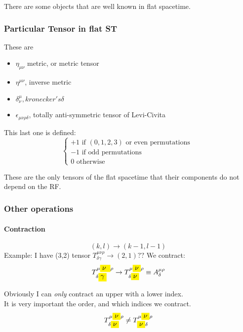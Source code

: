 There are some objects that are well known in flat spacetime.
\subsubsection{Particular Tensor in flat ST}
These are
\begin{itemize}
	\item $\eta_{\mu  \nu }$ metric, or metric tensor
	\item $\eta^{\mu \nu }$, inverse metric
	\item $\delta^{\mu }_{\nu }, kronecker's \delta $
	\item $\epsilon_{\mu \nu \rho \delta }$, totally anti-symmetric tensor of Levi-Civita
\end{itemize}

This last one is defined:
\begin{equation}
\begin{cases}
+1 \text{ if } \left( 0,1,2,3 \right) \text{ or even permutations } \\
-1 \text{ if  odd permutations} \\
0 \text{ otherwise }
\end{cases}
\end{equation}

These are the only tensors of the flat spacetime that their components do not depend on the RF. \\

\subsubsection{Other operations}
\paragraph{Contraction} \[
	\left( k,l \right) \to \left( k-1, l-1 \right)
\]
Example: I have (3,2) tensor $T^{\mu \nu \rho }_{\delta \gamma } \to \left( 2,1 \right) ??$
We contract:
\[
	T^{\mu \colorbox{yellow}{$\nu$ } \rho  }_{\delta \colorbox{yellow}{$\gamma$} } \to T^{\mu  \colorbox{yellow}{$ \nu   $} \rho }_{\delta \colorbox{yellow}{$ \nu   $} } \equiv A^{\mu  \rho }_{\delta } 
\]

Obviously I can \emph{only} contract an upper with a lower index. \\
It is very important the order, and which indices we contract.
\[
T^{\mu  \colorbox{yellow}{$ \nu   $} \rho }_{\delta  \colorbox{yellow}{$ \nu   $} } \neq T^{\mu  \colorbox{yellow}{$ \nu   $} \rho }_{ \colorbox{yellow}{$ \nu   $} \delta  }
\]

